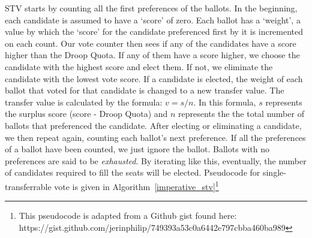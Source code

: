 STV starts by counting all the first preferences of the ballots. In the
beginning, each candidate is assumed to have a `score' of zero. Each ballot has
a `weight', a value by which the `score' for the candidate preferenced first by
it is incremented on each count. Our vote counter then sees if any of the
candidates have a score higher than the Droop Quota. If any of them have a score
higher, we choose the candidate with the highest score and elect them. If not,
we eliminate the candidate with the lowest vote score. If a candidate is
elected, the weight of each ballot that voted for that candidate is changed to a
new transfer value. The transfer value is calculated by the formula: $v = s/n$.
In this formula, $s$ represents the surplus score (score - Droop Quota) and $n$
represents the the total number of ballots that preferenced the candidate. After
electing or eliminating a candidate, we then repeat again, counting each
ballot's next preference. If all the preferences of a ballot have been counted,
we just ignore the ballot. Ballots with no preferences are said to be
\textit{exhausted}. By iterating like this, eventually, the number of candidates
required to fill the seats will be elected. Pseudocode for single-transferrable
vote is given in Algorithm~\ref{imperative_stv}\footnote{This pseudocode is
adapted from a Github gist found here:\\
https://gist.github.com/jerinphilip/749393a53c0a6442e797cbba460ba989}


